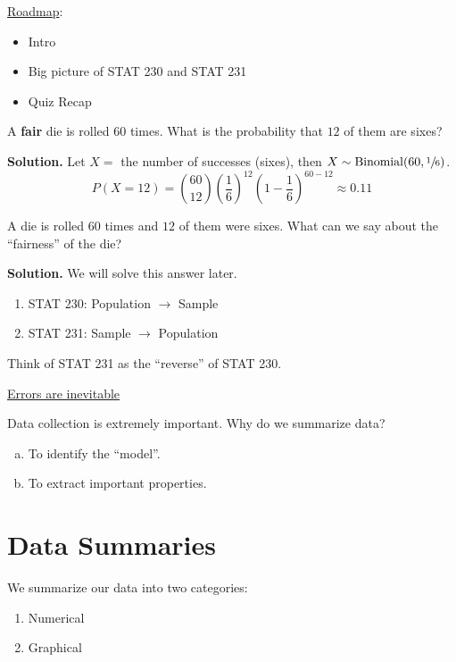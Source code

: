 \underline{Roadmap}:
\begin{itemize}
    \item Intro
    \item Big picture of STAT 230 and STAT 231
    \item Quiz Recap
\end{itemize}
\begin{exbox}
    \begin{example}[STAT 230]
        A \textbf{fair} die is rolled $ 60 $ times. What is the
        probability that $ 12 $ of them are sixes?
        
        \textbf{Solution.}
        Let $ X= $ the number of successes (sixes), then $ X \sim \operatorname{Binomial}(60,\sfrac{1}{6}) $.
        \[ P(X=12)
            =\binom{60}{12}\left( \frac{1}{6}  \right)^{12}\left( 1-\frac{1}{6} \right)^{60-12}
            \approx 0.11\]
    \end{example}
\end{exbox}
\begin{exbox}
    \begin{example}[STAT 231]
        A die is rolled $ 60 $ times and $ 12 $ of them were sixes.
        What can we say about the ``fairness'' of the die?
        
        \textbf{Solution.} We will solve this answer later.
    \end{example}
\end{exbox}
\begin{enumerate}
    \item STAT 230: Population $ \rightarrow $ Sample
    \item STAT 231: Sample $ \rightarrow $ Population
\end{enumerate}
Think of STAT 231 as the ``reverse'' of STAT 230.

\underline{Errors are inevitable}

Data collection is extremely important. Why do we summarize data?
\begin{enumerate}[(a)]
    \item To identify the ``model''.
    \item To extract important properties.
\end{enumerate}

\section{Data Summaries}

We summarize our data into two categories:
\begin{enumerate}[(1)]
    \item Numerical
    \item Graphical
\end{enumerate}


